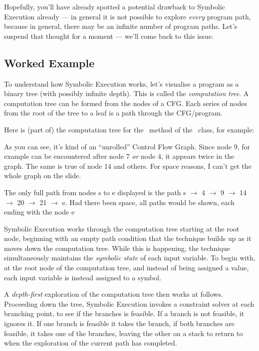 Hopefully, you'll have already spotted a potential drawback to Symbolic
Execution already --- in general it is not possible to explore {\it every}
program path, because in general, there may be an infinite number of program
paths. Let's suspend that thought for a moment --- we'll come back to this issue.

\subsection{Worked Example}

To understand how Symbolic Execution works, let's visualise a program as a
binary tree (with possibly infinite depth). This is called the {\it computation
tree}. A computation tree can be formed from the nodes of a CFG. Each series of
nodes from the root of the tree to a leaf is a path through the CFG/program.

Here is (part of) the computation tree for the \classifymethod~method of the
\triangleclass~class, for example:



As you can see, it's kind of an ``unrolled'' Control Flow Graph. Since node 9,
for example can be encountered after node 7 {\it or} node 4, it appears twice in
the graph. The same is true of node 14 and others. For space reasons, I can't
get the whole graph on the slide. 


The only full path from nodes s to e displayed is the path s $\rightarrow$ 4
$\rightarrow$ 9 $\rightarrow$ 14 $\rightarrow$ 20 $\rightarrow$ 21 $\rightarrow$
e. Had there been space, all paths would be shown, each ending with the node e

Symbolic Execution works through the computation tree starting at the root node,
beginning with an empty path condition that the technique builds up as it moves
down the computation tree. While this is happening, the technique simultaneously
maintains the {\it symbolic state} of each input variable. To begin with, at the
root node of the computation tree, and instead of being assigned a value, each
input variable is instead assigned to a symbol. 


A {\it depth-first} exploration of the computation tree then works at follows.
Proceeding down the tree, Symbolic Execution invokes a constraint solver at each
branching point, to see if the branches is feasible. If a branch is not
feasible, it ignores it. If one branch is feasible it takes the branch, if both
branches are feasible, it takes one of the branches, leaving the other on a
stack to return to when the exploration of the current path has completed. 

